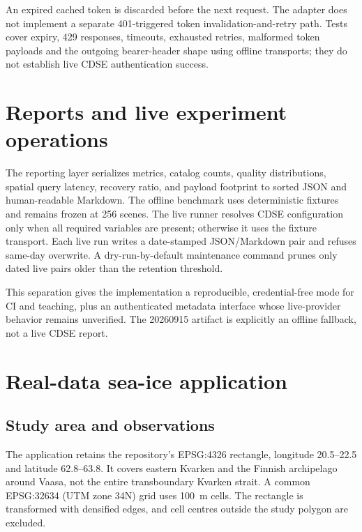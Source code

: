 An expired cached token is discarded before the next request. The adapter does not implement a
separate 401-triggered token invalidation-and-retry path. Tests cover expiry, 429 responses,
timeouts, exhausted retries, malformed token payloads and the outgoing bearer-header shape using
offline transports; they do not establish live CDSE authentication success.

\section{Reports and live experiment operations}

The reporting layer serializes metrics, catalog counts, quality distributions, spatial query
latency, recovery ratio, and payload footprint to sorted JSON and human-readable Markdown. The
offline benchmark uses deterministic fixtures and remains frozen at 256 scenes. The live runner
resolves CDSE configuration only when all required variables are present; otherwise it uses the
fixture transport. Each live run writes a date-stamped JSON/Markdown pair and refuses same-day
overwrite. A dry-run-by-default maintenance command prunes only dated live pairs older than the
retention threshold.

This separation gives the implementation a reproducible, credential-free mode for CI and
teaching, plus an authenticated metadata interface whose live-provider behavior remains
unverified. The 20260915 artifact is explicitly an offline fallback, not a live CDSE report.

\section{Real-data sea-ice application}
\label{sec:seaice-method}

\subsection{Study area and observations}

The application retains the repository's EPSG:4326 rectangle, longitude 20.5--22.5 and
latitude 62.8--63.8. It covers eastern Kvarken and the Finnish archipelago around Vaasa,
not the entire transboundary Kvarken strait. A common EPSG:32634 (UTM zone 34N) grid uses
100~m cells. The rectangle is transformed with densified edges, and cell centres outside
the study polygon are excluded.

